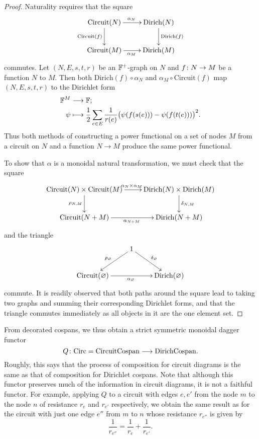 \begin{proof}
Naturality requires that the square
\[
\xymatrix{
  \mathrm{Circuit}(N) \ar[r]^{\alpha_N} \ar[d]_{\mathrm{Circuit}(f)} &
  \mathrm{Dirich}(N) \ar[d]^{\mathrm{Dirich}(f)}  \\
  \mathrm{Circuit}(M) \ar[r]_{\alpha_M} & \mathrm{Dirich}(M)
}
\]
commutes. Let $(N,E,s,t,r)$ be an ${\mathbb F}^+$-graph on $N$ and $f{\colon} N \to M$ be a
function $N$ to $M$. Then both $\mathrm{Dirich}(f) \circ \alpha_N$ and $\alpha_M
\circ \mathrm{Circuit}(f)$ map $(N,E,s,t,r)$ to the Dirichlet form
\begin{align*}
  {\mathbb F}^M &\longrightarrow {\mathbb F};\\
  \psi &\longmapsto \frac{1}{2} \sum_{e \in E}\frac{1}{r(e)}
  \big(\psi(f(s(e)))-\psi(f(t(e)))\big)^2.
\end{align*}
Thus both methods of constructing a power functional on a set of nodes $M$ from
a circuit on $N$ and a function $N \to M$ produce the same power functional.

To show that $\alpha$ is a monoidal natural transformation, we must check that
the square
\[
\xymatrix{
  \mathrm{Circuit}(N) \times \mathrm{Circuit}(M) \ar[r]^{\alpha_N \times
  \alpha_M} \ar[d]_{\rho_{N,M}} & \mathrm{Dirich}(N) \times \mathrm{Dirich}(M)
  \ar[d]^{\delta_{N,M}}  \\
  \mathrm{Circuit}(N+M) \ar[r]_{\alpha_{N+M}} & \mathrm{Dirich}(N+M)
}
\]
and the triangle
\[
\xymatrix{
  & 1 \ar[dl]_{\rho_\varnothing} \ar[dr]^{\delta_\varnothing}\\
\mathrm{Circuit}(\varnothing)  \ar[rr]_{\alpha_\varnothing} &&
\mathrm{Dirich}(\varnothing)
}
\]
commute. It is readily observed that both paths around the square lead to taking
two graphs and summing their corresponding Dirichlet forms, and that the
triangle commutes immediately as all objects in it are the one element set.
\end{proof}

From decorated cospans, we thus obtain a strict symmetric monoidal dagger functor
\[
  Q {\colon} \mathrm{Circ} = \mathrm{CircuitCospan} \longrightarrow \mathrm{DirichCospan}.
\]
Roughly, this says that the process of composition for circuit diagrams is the
same as that of composition for Dirichlet cospans. Note that although this
functor preserves much of the information in circuit diagrams, it is not a
faithful functor.  For example, applying $Q$ to a circuit with edges $e,e'$ from
the node $m$ to the node $n$ of resistance $r_e$ and $r_{e'}$ respectively, we
obtain the same result as for the circuit with just one edge $e''$ from $m$ to
$n$ whose resistance $r_{e''}$ is given by
\[
           \frac{1}{r_{e''}} = \frac{1}{r_e} + \frac{1}{r_{e'}}  .
\]

